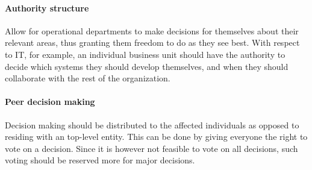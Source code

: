 \paragraph*{Authority structure} Allow for operational departments to make decisions for themselves about their relevant areas, thus granting them freedom to do as they see best. With respect to IT, for example, an individual business unit should have the authority to decide which systems they should develop themselves, and when they should collaborate with the rest of the organization. 

\paragraph*{Peer decision making} Decision making should be distributed to the affected individuals as opposed to residing with an top-level entity. This can be done by giving everyone the right to vote on a decision. Since it is however not feasible to vote on all decisions, such voting should be reserved more for major decisions. 


